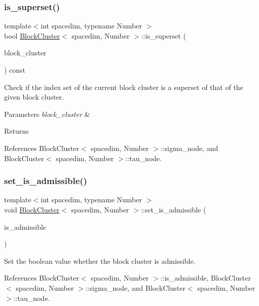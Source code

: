 \subsubsection{\texorpdfstring{is\+\_\+superset()}{is\_superset()}}
{\footnotesize\ttfamily template$<$int spacedim, typename Number $>$ \\
bool \hyperlink{classBlockCluster}{Block\+Cluster}$<$ spacedim, Number $>$\+::is\+\_\+superset (\begin{DoxyParamCaption}\item[{const \hyperlink{classBlockCluster}{Block\+Cluster}$<$ spacedim, Number $>$ \&}]{block\+\_\+cluster }\end{DoxyParamCaption}) const}

Check if the index set of the current block cluster is a superset of that of the given block cluster. 
\begin{DoxyParams}{Parameters}
{\em block\+\_\+cluster} & \\
\hline
\end{DoxyParams}
\begin{DoxyReturn}{Returns}

\end{DoxyReturn}


References Block\+Cluster$<$ spacedim, Number $>$\+::sigma\+\_\+node, and Block\+Cluster$<$ spacedim, Number $>$\+::tau\+\_\+node.

\mbox{\label{classBlockCluster_a598050ab9a4340c3cd02f678788f5bb0}} 
\subsubsection{\texorpdfstring{set\+\_\+is\+\_\+admissible()}{set\_is\_admissible()}}
{\footnotesize\ttfamily template$<$int spacedim, typename Number $>$ \\
void \hyperlink{classBlockCluster}{Block\+Cluster}$<$ spacedim, Number $>$\+::set\+\_\+is\+\_\+admissible (\begin{DoxyParamCaption}\item[{const bool}]{is\+\_\+admissible }\end{DoxyParamCaption})}

Set the boolean value whether the block cluster is admissible. 

References Block\+Cluster$<$ spacedim, Number $>$\+::is\+\_\+admissible, Block\+Cluster$<$ spacedim, Number $>$\+::sigma\+\_\+node, and Block\+Cluster$<$ spacedim, Number $>$\+::tau\+\_\+node.

